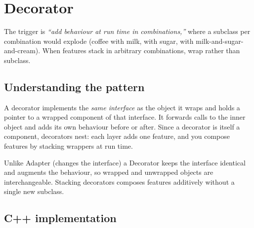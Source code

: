 \section{Decorator}
\label{sec:pat-decorator}


\begin{patternbox}
The trigger is \emph{``add behaviour at run time in combinations,''} where
a subclass per combination would explode (coffee with milk, with sugar,
with milk-and-sugar-and-cream). When features stack in arbitrary
combinations, wrap rather than subclass.
\end{patternbox}

\subsection*{Understanding the pattern}

A decorator implements the \emph{same interface} as the object it wraps
and holds a pointer to a wrapped component of that interface. It forwards
calls to the inner object and adds its own behaviour before or after. Since
a decorator is itself a component, decorators nest: each layer adds one
feature, and you compose features by stacking wrappers at run time.

\begin{ideabox}
Unlike Adapter (changes the interface) a Decorator keeps the interface
identical and augments the behaviour, so wrapped and unwrapped objects are
interchangeable. Stacking decorators composes features additively without
a single new subclass.
\end{ideabox}

\subsection*{C++ implementation}

